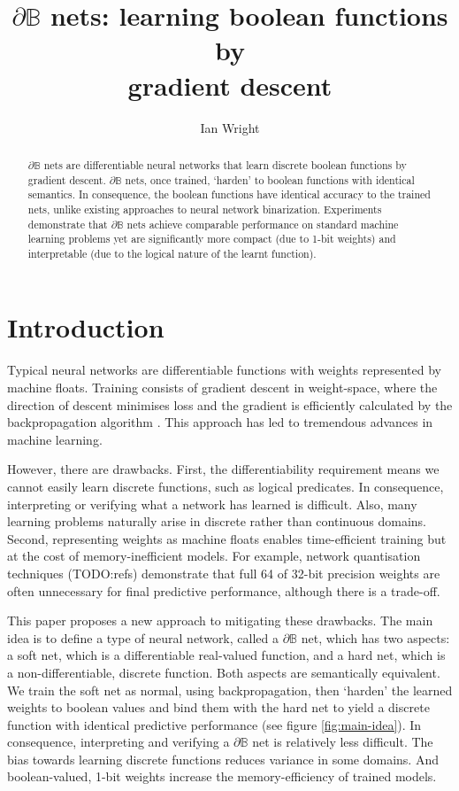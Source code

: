 \documentclass{article} %
\title{$\partial\mathbb{B}$ nets: learning boolean functions by\\gradient descent}
\author{Ian Wright}
\begin{document}
\maketitle

\begin{abstract}
	$\partial\mathbb{B}$ nets are differentiable neural networks 
	that learn discrete boolean functions by gradient descent.
	$\partial\mathbb{B}$ nets, once trained, `harden' to boolean functions with identical semantics. In consequence, the boolean functions have identical accuracy to the trained nets, unlike existing approaches to neural network binarization. Experiments demonstrate that $\partial\mathbb{B}$ nets achieve comparable performance on standard machine learning problems yet are significantly more compact (due to 1-bit weights) and interpretable (due to the logical nature of the learnt function).
\end{abstract}

\section{Introduction}

Typical neural networks are differentiable functions with weights represented by machine floats. Training consists of gradient descent in weight-space, where the direction of descent minimises loss and the gradient is efficiently calculated by the backpropagation algorithm \citep{rumelhart1986learning}. This approach has led to tremendous advances in machine learning.

However, there are drawbacks. First, the differentiability requirement means we cannot easily learn discrete functions, such as logical predicates. In consequence, interpreting or verifying what a network has learned is difficult. Also, many learning problems naturally arise in discrete rather than continuous domains. Second, representing weights as machine floats enables time-efficient training but at the cost of memory-inefficient models. For example, network quantisation techniques (TODO:refs) demonstrate that full 64 of 32-bit precision weights are often unnecessary for final predictive performance, although there is a trade-off.

This paper proposes a new approach to mitigating these drawbacks. The main idea is to define a type of neural network, called a $\partial \mathbb{B}$ net, which has two aspects: a soft net, which is a differentiable real-valued function, and a hard net, which is a non-differentiable, discrete function. Both aspects are semantically equivalent. We train the soft net as normal, using backpropagation, then `harden' the learned weights to boolean values and bind them with the hard net to yield a discrete function with identical predictive performance (see figure \ref{fig:main-idea}). In consequence, interpreting and verifying a $\partial \mathbb{B}$ net is relatively less difficult. The bias towards learning discrete functions reduces variance in some domains. And boolean-valued, 1-bit weights increase the memory-efficiency of trained models.
\end{document}
